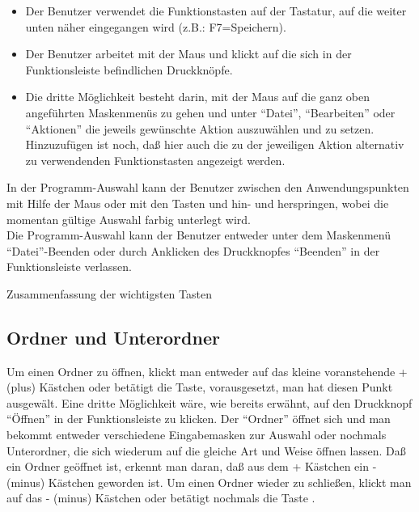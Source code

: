 \begin{itemize}
\item Der Benutzer verwendet die Funktionstasten auf der Tastatur, auf die
weiter unten n\"{a}her eingegangen wird (z.B.: F7=Speichern).
\item Der Benutzer arbeitet mit der Maus und klickt auf die sich in der
Funktionsleiste befindlichen Druckkn\"{o}pfe.
\item Die dritte M\"{o}glichkeit besteht darin, mit der Maus auf die ganz oben
angef\"{u}hrten Maskenmen\"{u}s zu gehen und unter ``Datei'', ``Bearbeiten''
oder ``Aktionen'' die jeweils gew\"{u}nschte Aktion auszuw\"{a}hlen und zu
setzen. Hinzuzuf\"{u}gen ist noch, da{\ss} hier auch die zu der
jeweiligen Aktion alternativ zu verwendenden Funktionstasten angezeigt werden. 
\end{itemize}

In der Programm-Auswahl kann der Benutzer zwischen den
Anwendungspunkten  mit Hilfe der Maus oder mit den Tasten
\Taste{$\downarrow$} und \Taste{$\uparrow$} hin- und herspringen, wobei die
momentan g\"{u}ltige Auswahl farbig unterlegt wird.\\

Die Programm-Auswahl kann der Benutzer entweder unter dem Maskenmen\"{u}
``Datei''-Beenden  oder durch
Anklicken des Druckknopfes ``Beenden'' in der Funktionsleiste
verlassen.

\vspace{0.5cm}

\begin{Keys}{Zusammenfassung der wichtigsten Tasten}
\\
\end{Keys}

\subsection{Ordner und Unterordner}

Um einen Ordner zu \"{o}ffnen, klickt man entweder auf das kleine
voranstehende + (plus) K\"{a}stchen  oder bet\"{a}tigt die  
Taste, vorausgesetzt, man hat diesen Punkt ausgew\"{a}lt. Eine dritte M\"{o}glichkeit
w\"{a}re, wie bereits erw\"{a}hnt, auf den Druckknopf ``\"{O}ffnen'' in der
Funktionsleiste zu klicken. Der ``Ordner'' \"{o}ffnet sich und man bekommt
entweder verschiedene Eingabemasken zur Auswahl oder nochmals Unterordner, die
sich wiederum auf die gleiche Art und Weise \"{o}ffnen lassen. Da{\ss} ein
Ordner ge\"{o}ffnet ist, erkennt man daran, da{\ss} aus dem + K\"{a}stchen ein
- (minus) K\"{a}stchen geworden ist. Um einen Ordner wieder zu schlie{\ss}en,
klickt man auf das - (minus) K\"{a}stchen oder bet\"{a}tigt nochmals die Taste
.\\

